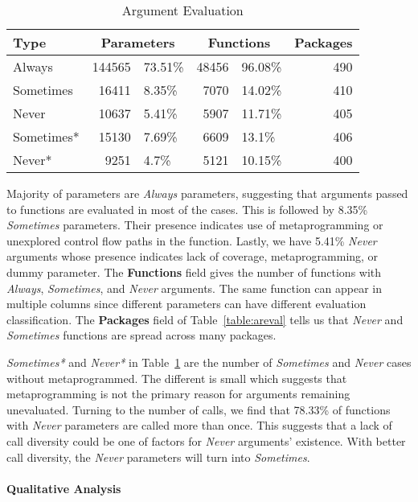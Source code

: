 \documentclass[screen,acmsmall]{acmart}
\newcommand{\always}{\emph{Always}\xspace}
\newcommand{\sometimes}{\emph{Sometimes}\xspace}
\newcommand{\sometimesStar}{\emph{Sometimes*}\xspace}
\newcommand{\never}{\emph{Never}\xspace}
\newcommand{\neverStar}{\emph{Never*}\xspace}
\begin{document}
\begin{table}[!h]
  \vspace{-3mm}
  \caption{Argument Evaluation}\label{table:argeval}
  \vspace{-3mm}
  \begin{tabular}{lr|lr|lr}
    \toprule
    \textbf{Type}&\multicolumn{2}{c}{\textbf{Parameters}}&\multicolumn{2}{c}{\textbf{Functions}}&\textbf{Packages}\\
    \midrule
    Always&144565&73.51\%&48456&96.08\%&490\\
    Sometimes&16411&8.35\%&7070&14.02\%&410\\
    Never&10637&5.41\%&5907&11.71\%&405\\
    \midrule
    Sometimes*&15130&7.69\%&6609&13.1\%&406\\
    Never*&9251&4.7\%&5121&10.15\%&400\\
    \bottomrule
  \end{tabular}
\end{table}

Majority of parameters are \always parameters, suggesting that arguments passed
to functions are evaluated in most of the cases. This is followed by 8.35\%
\sometimes parameters. Their presence indicates use of metaprogramming or
unexplored control flow paths in the function. Lastly, we have 5.41\% \never
arguments whose presence indicates lack of coverage, metaprogramming, or dummy
parameter. The \textbf{Functions} field gives the number of functions with
\always, \sometimes, and \never arguments. The same function can appear in
multiple columns since different parameters can have different evaluation
classification. The \textbf{Packages} field of Table~\ref{table:areval} tells us
that \never and \sometimes functions are spread across many packages.


\sometimesStar and \neverStar in Table~\ref{table:argeval} are the number of
\sometimes and \never cases without metaprogrammed. The different is small which
suggests that metaprogramming is not the primary reason for arguments remaining
unevaluated. Turning to the number of calls, we find that 78.33\% of functions
with \never parameters are called more than once. This suggests that a lack of
call diversity could be one of factors for \never arguments' existence. With
better call diversity, the \never parameters will turn into \sometimes.

\paragraph{Qualitative Analysis}
\end{document}
